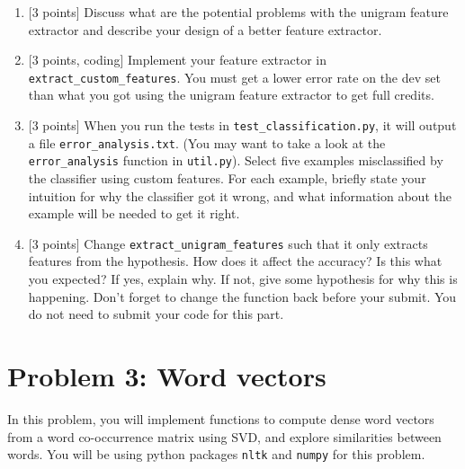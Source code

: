 \documentclass{article}
\theoremstyle{case}
\theoremstyle{definition}
\begin{document}
\begin{enumerate}
\begin{shaded}
        \end{shaded}

    \newpage
    \item {[3 points]} Discuss what are the potential problems with the unigram feature extractor
        and describe your design of a better feature extractor. 
        \begin{shaded}
        \end{shaded}

    \newpage
    \item {[3 points, coding]}
        Implement your feature extractor in \texttt{extract\_custom\_features}.
        You must get a lower error rate on the dev set than what you got using the unigram feature extractor to get full credits.
        \begin{shaded}
            
        \end{shaded}

    \newpage
\item {[3 points]} When you run the tests in \texttt{test\_classification.py}, it will output a file \texttt{error\_analysis.txt}. (You may want to take a look at the \texttt{error\_analysis} function in \texttt{util.py}).
    Select five examples misclassified by the classifier using custom features.
        For each example, briefly state your intuition for why the classifier got it wrong, and what information about the example will be needed to get it right.
        \begin{shaded}
        \end{shaded}

    \newpage
\item {[3 points]} Change \texttt{extract\_unigram\_features} such that it only extracts features from the hypothesis.
    How does it affect the accuracy? Is this what you expected? If yes, explain why. If not, give some hypothesis for why this is happening.
    Don't forget to change the function back before your submit. You do not need to submit your code for this part.
        \begin{shaded}
        \end{shaded}

\end{enumerate}

\newpage
\section*{Problem 3: Word vectors}
In this problem, you will implement functions to compute dense word vectors from a word co-occurrence matrix using SVD, and explore similarities between words.
You will be using python packages \texttt{nltk} and \texttt{numpy} for this problem.
\end{document}
